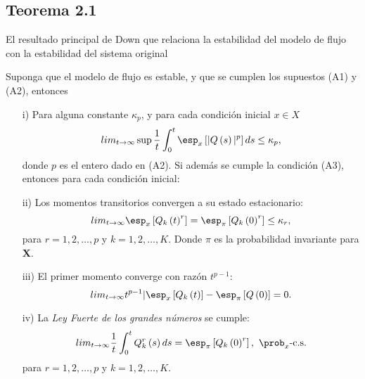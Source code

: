 \subsection{Teorema 2.1}



El resultado principal de Down \cite{Down} que relaciona la estabilidad del modelo de flujo con la estabilidad del sistema original

\begin{Teo}\label{Tma.2.1.Down}
Suponga que el modelo de flujo es estable, y que se cumplen los supuestos (A1) y (A2), entonces
\begin{itemize}
\item[i)] Para alguna constante $\kappa_{p}$, y para cada
condici\'on inicial $x\in X$
\begin{equation}\label{Estability.Eq1}
lim_{t\rightarrow\infty}\sup\frac{1}{t}\int_{0}^{t}\esp_{x}\left[|Q\left(s\right)|^{p}\right]ds\leq\kappa_{p},
\end{equation}
donde $p$ es el entero dado en (A2). Si adem\'as se cumple
la condici\'on (A3), entonces para cada condici\'on inicial:

\item[ii)] Los momentos transitorios convergen a su estado estacionario:
 \begin{equation}\label{Estability.Eq2}
lim_{t\rightarrow\infty}\esp_{x}\left[Q_{k}\left(t\right)^{r}\right]=\esp_{\pi}\left[Q_{k}\left(0\right)^{r}\right]\leq\kappa_{r},
\end{equation}
para $r=1,2,\ldots,p$ y $k=1,2,\ldots,K$. Donde $\pi$ es la
probabilidad invariante para $\mathbf{X}$.

\item[iii)]  El primer momento converge con raz\'on $t^{p-1}$:
\begin{equation}\label{Estability.Eq3}
lim_{t\rightarrow\infty}t^{p-1}|\esp_{x}\left[Q_{k}\left(t\right)\right]-\esp_{\pi}\left[Q\left(0\right)\right]=0.
\end{equation}

\item[iv)] La {\em Ley Fuerte de los grandes n\'umeros} se cumple:
\begin{equation}\label{Estability.Eq4}
lim_{t\rightarrow\infty}\frac{1}{t}\int_{0}^{t}Q_{k}^{r}\left(s\right)ds=\esp_{\pi}\left[Q_{k}\left(0\right)^{r}\right],\textrm{
}\prob_{x}\textrm{-c.s.}
\end{equation}
para $r=1,2,\ldots,p$ y $k=1,2,\ldots,K$.
\end{itemize}
\end{Teo}


